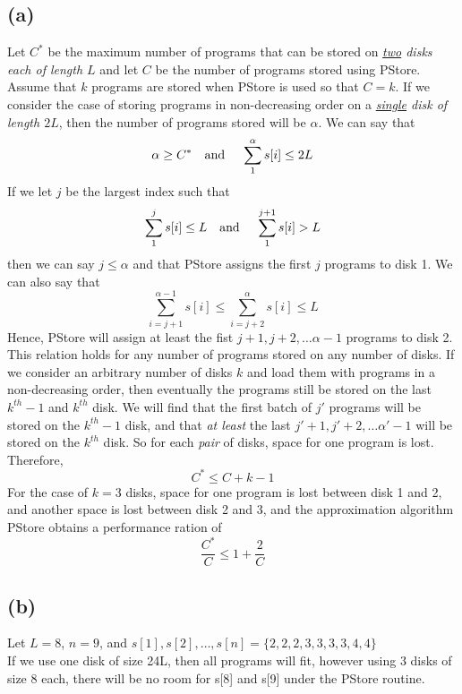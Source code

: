 	\subsection*{(a)}
		Let $C^*$ be the maximum number of programs that can be stored on \textit{\underline{two} disks each of length $L$} and let $C$ be the number of programs stored using PStore. Assume that $k$ programs are stored when PStore is used so that $C=k$. If we consider the case of storing programs in non-decreasing order on a \textit{\underline{single} disk of length $2L$}, then the number of programs stored will be $\alpha$. We can say that \[\alpha \geq C^* \text{\quad and \quad} \sum_{1}^{\alpha}s[i] \leq 2L\]  If we let $j$ be the largest index such that \[\sum_{1}^{j}s[i] \leq L \text{\quad and \quad } \sum_{1}^{j+1}s[i] > L \] then we can say $j\leq \alpha$ and that PStore assigns the first $j$ programs to disk 1. We can also say that 
		\begin{equation*}
			\sum_{i = j+1}^{\alpha - 1}s[i] \leq \sum_{i = j+2}^{\alpha}s[i] \leq L
		\end{equation*}
		Hence, PStore will assign at least the fist $j+1, j+2, \dots \alpha -1$ programs to disk 2. This relation holds for any number of programs stored on any number of disks. If we consider an arbitrary number of disks $k$ and load them with programs in a non-decreasing order, then eventually the programs still be stored on the last $k^{th}-1$ and $k^{th}$ disk. We will find that the first batch of $j'$ programs will be stored on the $k^{th}-1$ disk, and that \textit{at least} the last $j'+1, j'+2, \dots \alpha' -1$ will be stored on the $k^{th}$ disk. So for each \textit{pair} of disks, space for one program is lost. Therefore, 
		\begin{equation*}
			C^* \leq C + k - 1
		\end{equation*}
		For the case of $k = 3$ disks, space for one program is lost between disk 1 and 2, and another space is lost between disk 2 and 3, and the approximation algorithm PStore obtains a performance ration of 
		\begin{equation*}
			\frac{C^*}{C} \leq 1 + \frac{2}{C}
		\end{equation*} 
	\subsection*{(b)}
		Let $L=8$, $n=9$, and $s[1], s[2], \dots, s[n] = \{2, 2, 2, 3, 3, 3, 3, 4, 4\}$\\
		If we use one disk of size 24L, then all programs will fit, however using 3 disks of size 8 each, there will be no room for s[8] and s[9] under the PStore routine. 
		
